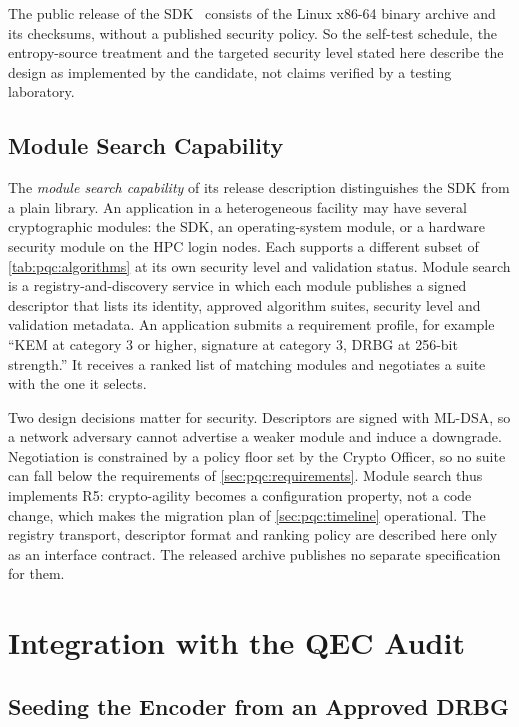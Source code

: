 The public release of the SDK~\cite{guo2026lightriderqpc} consists of the Linux x86-64 binary archive and its checksums, without a published security policy. So the self-test schedule, the entropy-source treatment and the targeted security level stated here describe the design as implemented by the candidate, not claims verified by a testing laboratory.

\subsection{Module Search Capability}\label{sec:pqc:search}

The \emph{module search capability} of its release description distinguishes the SDK from a plain library. An application in a heterogeneous facility may have several cryptographic modules: the SDK, an operating-system module, or a hardware security module on the HPC login nodes. Each supports a different subset of \cref{tab:pqc:algorithms} at its own security level and validation status. Module search is a registry-and-discovery service in which each module publishes a signed descriptor that lists its identity, approved algorithm suites, security level and validation metadata. An application submits a requirement profile, for example ``KEM at category 3 or higher, signature at category 3, DRBG at 256-bit strength.'' It receives a ranked list of matching modules and negotiates a suite with the one it selects.

Two design decisions matter for security. Descriptors are signed with ML-DSA, so a network adversary cannot advertise a weaker module and induce a downgrade. Negotiation is constrained by a policy floor set by the Crypto Officer, so no suite can fall below the requirements of \cref{sec:pqc:requirements}. Module search thus implements R5: crypto-agility becomes a configuration property, not a code change, which makes the migration plan of \cref{sec:pqc:timeline} operational. The registry transport, descriptor format and ranking policy are described here only as an interface contract. The released archive publishes no separate specification for them.

\section{Integration with the QEC Audit}\label{sec:pqc:integration}

\subsection{Seeding the Encoder from an Approved DRBG}\label{sec:pqc:seed}

